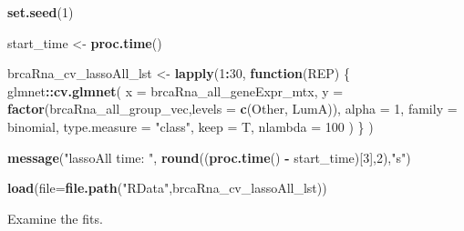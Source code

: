 \documentclass[
]{book}
\newenvironment{Shaded}{\begin{snugshade}}{\end{snugshade}}
\newcommand{\ControlFlowTok}[1]{\textcolor[rgb]{0.13,0.29,0.53}{\textbf{#1}}}
\newcommand{\DataTypeTok}[1]{\textcolor[rgb]{0.13,0.29,0.53}{#1}}
\newcommand{\DecValTok}[1]{\textcolor[rgb]{0.00,0.00,0.81}{#1}}
\newcommand{\KeywordTok}[1]{\textcolor[rgb]{0.13,0.29,0.53}{\textbf{#1}}}
\newcommand{\NormalTok}[1]{#1}
\newcommand{\OperatorTok}[1]{\textcolor[rgb]{0.81,0.36,0.00}{\textbf{#1}}}
\newcommand{\StringTok}[1]{\textcolor[rgb]{0.31,0.60,0.02}{#1}}
\begin{document}
\begin{Shaded}
\begin{Highlighting}[]
\KeywordTok{set.seed}\NormalTok{(}\DecValTok{1}\NormalTok{)}

\NormalTok{start\_time <{-}}\StringTok{  }\KeywordTok{proc.time}\NormalTok{()}

\NormalTok{brcaRna\_cv\_lassoAll\_lst <{-}}\StringTok{ }\KeywordTok{lapply}\NormalTok{(}\DecValTok{1}\OperatorTok{:}\DecValTok{30}\NormalTok{, }\ControlFlowTok{function}\NormalTok{(REP) \{}
\NormalTok{glmnet}\OperatorTok{::}\KeywordTok{cv.glmnet}\NormalTok{(}
 \DataTypeTok{x =}\NormalTok{ brcaRna\_all\_geneExpr\_mtx,}
 \DataTypeTok{y =} \KeywordTok{factor}\NormalTok{(brcaRna\_all\_group\_vec,}\DataTypeTok{levels =} \KeywordTok{c}\NormalTok{(}\StringTok{\textquotesingle{}Other\textquotesingle{}}\NormalTok{, }\StringTok{\textquotesingle{}LumA\textquotesingle{}}\NormalTok{)),}
 \DataTypeTok{alpha =} \DecValTok{1}\NormalTok{,}
 \DataTypeTok{family =} \StringTok{\textquotesingle{}binomial\textquotesingle{}}\NormalTok{,}
 \DataTypeTok{type.measure  =}  \StringTok{"class"}\NormalTok{,}
 \DataTypeTok{keep =}\NormalTok{ T,}
 \DataTypeTok{nlambda =} \DecValTok{100}
\NormalTok{)}
\NormalTok{\}}
\NormalTok{)}

\KeywordTok{message}\NormalTok{(}\StringTok{"lassoAll time: "}\NormalTok{, }\KeywordTok{round}\NormalTok{((}\KeywordTok{proc.time}\NormalTok{() }\OperatorTok{{-}}\StringTok{ }\NormalTok{start\_time)[}\DecValTok{3}\NormalTok{],}\DecValTok{2}\NormalTok{),}\StringTok{"s"}\NormalTok{)}
\end{Highlighting}
\end{Shaded}

\begin{Shaded}
\begin{Highlighting}[]
 \KeywordTok{load}\NormalTok{(}\DataTypeTok{file=}\KeywordTok{file.path}\NormalTok{(}\StringTok{"RData"}\NormalTok{,}\StringTok{\textquotesingle{}brcaRna\_cv\_lassoAll\_lst\textquotesingle{}}\NormalTok{))}
\end{Highlighting}
\end{Shaded}

Examine the fits.
\end{document}
